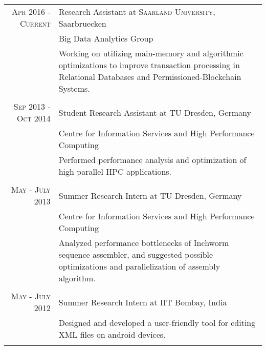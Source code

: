 \documentclass[a4paper,10pt]{article} %
\begin{document}
\begin{tabular}{r|p{11cm}}
\textsc{Apr 2016 - Current} & Research Assistant at \textsc{Saarland University}, Saarbruecken \\
                         & Big Data Analytics Group\\ 
& \footnotesize{Working on utilizing  main-memory and algorithmic optimizations to improve transaction processing in Relational Databases and Permissioned-Blockchain Systems.}\\
\multicolumn{2}{c}{} \\


\textsc{Sep 2013 - Oct 2014} & Student Research Assistant at \textsc{TU} Dresden, Germany \emph{}\\
                         & Centre for Information Services and High Performance Computing\\ 
& \footnotesize{Performed performance analysis and  optimization of high parallel HPC applications.}\\
\multicolumn{2}{c}{} \\


\textsc{May - July 2013} & Summer Research Intern at \textsc{TU} Dresden, Germany \emph{}\\
                         & Centre for Information Services and High Performance Computing\\ 
& \footnotesize{Analyzed performance bottlenecks of Inchworm sequence assembler, and suggested possible optimizations and parallelization of assembly algorithm.}\\
\multicolumn{2}{c}{} \\


\textsc{May - July 2012} & Summer Research Intern at \textsc{IIT} Bombay, India \emph{}\\
& \footnotesize{Designed and developed a user-friendly tool for editing XML files on android devices.}\\
\multicolumn{2}{c}{}
\end{tabular}

\end{document}
